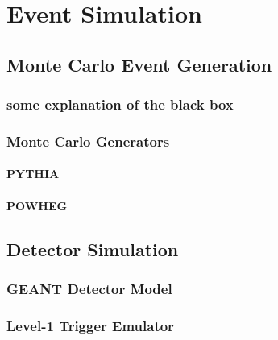 \chapter{Event Simulation}
\section{Monte Carlo Event Generation}
\subsection{some explanation of the black box}
\subsection{Monte Carlo Generators}
\subsubsection{PYTHIA}
\subsubsection{POWHEG}
\section{Detector Simulation}
\subsection{GEANT Detector Model}
\subsection{Level-1 Trigger Emulator}
